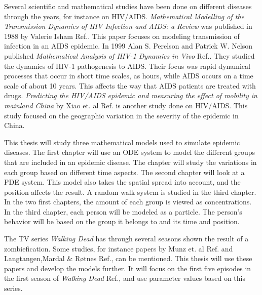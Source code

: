 \documentclass[%
twoside,                 %
final,                   %
chapterprefix=true,      %
open=right               %
10pt]{book}
\begin{document}
\vspace{3mm}




\vspace{3mm}


Several scientific and mathematical studies have been done on different diseases through the years, for instance on HIV/AIDS. \emph{Mathematical Modelling of the Transmission Dynamics of HIV Infection and AIDS: a Review} was published in 1988 by Valerie Isham Ref.\cite{isham1988mathematical}. This paper focuses on modeling transmission of infection in an AIDS epidemic. In 1999 Alan S. Perelson and Patrick W. Nelson published \emph{Mathematical Analysis of HIV-1 Dynamics in Vivo} Ref.\cite{perelson1999mathematical}. They studied the dynamics of HIV-1 pathogenesis to AIDS. Their focus was rapid dynamical processes that occur in short time scales, as hours, while AIDS occurs on a time scale of about 10 years. This affects the way that AIDS patients are treated with drugs. \emph{Predicting the HIV/AIDS epidemic and measuring the effect of mobility in mainland China} by Xiao et. al Ref.\cite{xiao2013predicting} is another study done on HIV/AIDS. This study focused on the geographic variation in the severity of the epidemic in China. 


\vspace{3mm}




\vspace{3mm}


This thesis will study three mathematical models used to simulate epidemic diseases. The first chapter will use an ODE system to model the different groups that are included in an epidemic disease. The chapter will study the variations in each group based on different time aspects. The second chapter will look at a PDE system. This model also takes the spatial spread into account, and the position affects the result. A random walk system is studied in the third chapter. In the two first chapters, the amount of each group is viewed as concentrations. In the third chapter, each person will be modeled as a particle. The person's behavior will be based on the group it belongs to and its time and position. 


\vspace{3mm}




\vspace{3mm}


The TV series \emph{Walking Dead} has through several seasons shown the result of a zombiefication. Some studies, for instance papers by Munz et. al Ref.\cite{munz2009zombies} and Langtangen,Mardal {\&} Røtnes Ref.\cite{zombie-math}, can be mentioned. This thesis will use these papers and develop the models further. It will focus on the first five episodes in the first season of \emph{Walking Dead} Ref.\cite{walking_dead}, and use parameter values based on this series. 
\end{document}
